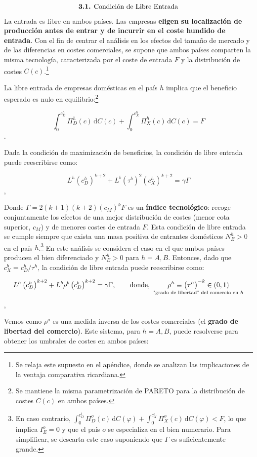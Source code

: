 \documentclass[10pt,a4paper]{article}
\begin{document}
$$\text{\textbf{3.1.} Condición de Libre Entrada}$$
La entrada es libre en ambos países. Las empresas \textbf{eligen su localización de producción antes de entrar y de incurrir en el coste hundido de entrada}. Con el fin de centrar el análisis en los efectos del tamaño de mercado y de las diferencias en costes comerciales, se supone que ambos países comparten la misma tecnología, caracterizada por el coste de entrada $F$ y la distribución de costes $C(c)$.\footnote{%
    Se relaja este supuesto en el apéndice, donde se analizan las implicaciones de la ventaja comparativa ricardiana.
} 

La libre entrada de empresas domésticas en el país $h$ implica que el beneficio esperado es nulo en equilibrio:\footnote{%
    Se mantiene la misma parametrización de PARETO para la distribución de costes $C(c)$ en ambos países.
}

$$\int_0^{c_D^h} \Pi_D^h(c)\, \mathrm dC(c) + \int_0^{c_X^h} \Pi_X^h(c)\, \mathrm dC(c) = F$$.

Dada la condición de maximización de beneficios, la condición de libre entrada puede reescribirse como:

$$L^h \left(c_D^h\right)^{k+2} + L^b \left(\tau^b\right)^2 \left(c_X^h\right)^{k+2} = \gamma\Gamma$$,

Donde $\Gamma = 2(k + 1)(k + 2)(c_M)^k F$ es un \textbf{índice tecnológico}: recoge conjuntamente los efectos de una mejor distribución de costes (menor cota superior, $c_M$) y de menores costes de entrada $F$. Esta condición de libre entrada se cumple siempre que exista una masa positiva de entrantes domésticos $N_E^h > 0$ en el país $h$.\footnote{%
    En caso contrario, $\int_0^{c_D^l} \Pi_D^o(c)\, \mathrm dC(\varphi) + \int_0^{c_X^o} \Pi_X^o(c)\, \mathrm dC(\varphi) < F$, lo que implica $I_E^o = 0$ y que el país $o$ se especializa en el bien numerario. Para simplificar, se descarta este caso suponiendo que $\Gamma$ es suficientemente grande.
} En este análisis se considera el caso en el que ambos países producen el bien diferenciado y $N_E^h > 0$ para $h = A, B$. Entonces, dado que $c_X^b = c_D^h/\tau^h$, la condición de libre entrada puede reescribirse como:

$$L^h \left(c_D^h\right)^{k+2} + L^b \rho^b \left(c_D^b\right)^{k+2} = \gamma\Gamma,\qquad\text{donde},\,\,\underset{\text{\scriptsize "grado de libertad" del comercio en $h$}}{\rho^h \equiv \left(\tau^h\right)^{-k} \in (0,1)}$$,

Vemos como $\rho^o$ es una medida inversa de los costes comerciales (el \textbf{grado de libertad del comercio}). Este sistema, para $h = A,B$, puede resolverse para obtener los umbrales de costes en ambos países:
\end{document}
